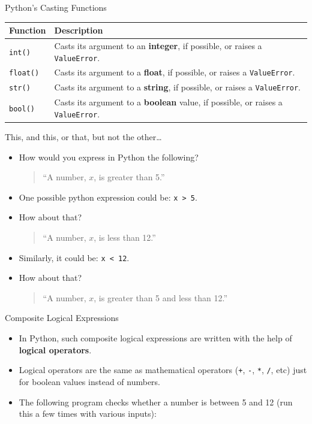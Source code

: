 \documentclass[aspectratio=169, 12pt, xcolor=table]{beamer}
\begin{document}
	\begin{frame}{Python's Casting Functions}
		\begin{tabular}{lp{}}
			\toprule%
			\textbf{Function} & \textbf{Description}\\\midrule%
			\texttt{int()} & Casts its argument to an \textbf{integer}, if possible, or raises a \texttt{ValueError}.\\%
			\texttt{float()} & Casts its argument to a \textbf{float}, if possible, or raises a \texttt{ValueError}.\\%
			\texttt{str()} & Casts its argument to a \textbf{string}, if possible, or raises a \texttt{ValueError}.\\%
			\texttt{bool()} & Casts its argument to a \textbf{boolean} value, if possible, or raises a \texttt{ValueError}.\\%
			\bottomrule
		\end{tabular}
	\end{frame}

	\begin{frame}{This, and this, or that, but not the other\ldots}
		\begin{itemize}
			\item How would you express in Python the following?
			\begin{quote}
				``A number, $x$, is greater than 5.''
			\end{quote}
			\item One possible python expression could be: \texttt{x > 5}.
			\item How about that?
			\begin{quote}
				``A number, $x$, is less than 12.''
			\end{quote}
			\item Similarly, it could be: \texttt{x < 12}.
			\item How about that?
			\begin{quote}
				``A number, $x$, is greater than 5 and less than 12.''
			\end{quote}
		\end{itemize}
	\end{frame}

	\begin{frame}{Composite Logical Expressions}
		\begin{itemize}
			\item In Python, such composite logical expressions are written with the help of \textbf{logical operators}.
			\item Logical operators are the same as mathematical operators (\texttt{+}, \texttt{-}, \texttt{*}, \texttt{/}, etc) just for boolean values instead of numbers.
			\item The following program checks whether a number is between 5 and 12 (run this a few times with various inputs):
		\end{itemize}
		
	\end{frame}
\end{document}
